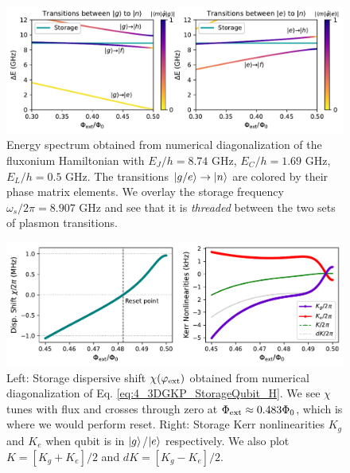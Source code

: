 \begin{figure}[h]
    \centering
    \includegraphics[width=0.93\linewidth]{Figures/4/3D_GKP_Theory_Spectrum.pdf}
    \caption[Simulated energy spectrum obtained from numerical diagonalization of the fluxonium Hamiltonian for 3D-GKP experiment.]{Energy spectrum obtained from numerical diagonalization of the fluxonium Hamiltonian with $E_J/h = 8.74$ GHz, $E_C/h = 1.69$ GHz, $E_L/h = 0.5$ GHz. The transitions $\lvert g/e\rangle\to\lvert n\rangle$ are colored by their phase matrix elements. We overlay the storage frequency $\omega_s/2\pi = 8.907$ GHz and see that it is \textit{threaded} between the two sets of plasmon transitions.}
    \label{fig:4_3D_GKP_Theory_Spectrum}
\end{figure}
\begin{figure}[h]
    \centering
    \includegraphics[width=0.93\linewidth]{Figures/4/3D_GKP_Theory_ChiKerr.pdf}
    \caption[Simulated dispersive shift and Kerr nonlinearities obtained from numerical diagonalization of the resonator-fluxonium system using the parameters of the 3D-GKP experiment.]{Left: Storage dispersive shift $\chi(\varphi_{\rm ext})$ obtained from numerical diagonalization of Eq. \eqref{eq:4_3DGKP_StorageQubit_H}. We see $\chi$ tunes with flux and crosses through zero at $\Phi_{\rm ext} \approx 0.483\Phi_0$, which is where we would perform reset. Right: Storage Kerr nonlinearities $K_g$ and $K_e$ when qubit is in $\lvert g\rangle$/$\lvert e\rangle$ respectively. We also plot $K = [K_g+K_e]/2$ and $dK = [K_g-K_e]/2$.}
    \label{fig:4_3D_GKP_Theory_ChiKerr}
\end{figure}

